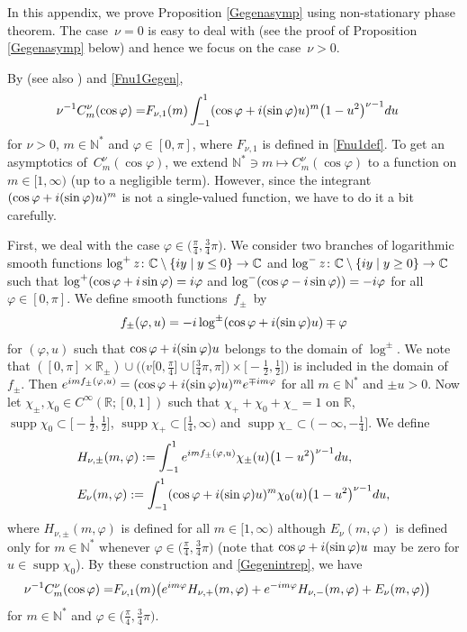 \documentclass[11pt]{article}
\numberwithin{equation}{section}
\def\R{\mathbb{R}}%
\DeclareMathOperator{\supp}{supp}%
\def\f{\varphi}
\def\n{\nu}
\begin{document}
In this appendix, we prove Proposition \ref{Gegenasymp} using non-stationary phase theorem. The case~${\n=0}$ is easy to deal with (see the proof of Proposition \ref{Gegenasymp} below) and hence we focus on the case~${\n>0}$.

By \cite[equation~(4.30)]{BKO} (see also \cite[Section 10]{IJ}) and \eqref{Fnu1Gegen},
\begin{align}\label{Gegenintrep}
\n^{-1}C_m^{\n}(\cos\f)=&F_{\n,1}(m)\int_{-1}^{1}(\cos\f+{\rm i}(\sin\f)u)^m\bigl(1-u^2\bigr)^{\n-1}{\rm d}u
\end{align}
for $\n>0$, $m\in\mathbb{N}^*$ and $\f\in [0,\pi]$, where $F_{\n,1}$ is defined in \eqref{Fnu1def}. To get an asymptotics of~$C_m^{\n}(\cos\f)$, we extend $\mathbb{N}^*\ni m\mapsto C_m^{\n}(\cos\f)$ to a function on $m\in [1,\infty)$ (up to a negligible term). However, since the integrant $(\cos\f+{\rm i}(\sin\f)u)^m$ is not a single-valued function, we have to do it a bit carefully.

First, we deal with the case $\f\in \bigl(\frac{\pi}{4}, \frac{3}{4}\pi\bigr)$.
We consider two branches of logarithmic smooth functions $\log^+z\colon\mathbb{C}\setminus \{{\rm i}y\mid y\leq 0\}\to \mathbb{C}$ and $\log^-z\colon\mathbb{C}\setminus \{{\rm i}y\mid y\geq 0\}\to \mathbb{C}$ such that $\log^+(\cos \f+{\rm i}\sin \f)={\rm i}\f$ and $\log^-(\cos\f-{\rm i}\sin\f))=-{\rm i}\f$ for all $\f\in [0,\pi]$. We define smooth functions~$f_{\pm}$~by
\begin{align*}
f_{\pm}(\f,u)=-{\rm i}\log^{\pm}(\cos\f+{\rm i}(\sin\f)u)\mp \f
\end{align*}
for $(\f,u)$ such that $\cos\f+{\rm i}(\sin\f)u$ belongs to the domain of $\log^{\pm}$. We note that
$([0,\pi]\times \R_{\pm})\cup \bigl(\bigl(v[0,\frac{\pi}{4}\bigr]\cup \bigl[\frac{3}{4}\pi,\pi\bigr]\bigr)\times \bigl[-\frac{1}{2},\frac{1}{2}\bigr] \bigr)$ is included in the domain of $f_{\pm}$.
Then ${\rm e}^{{\rm i}mf_{\pm}(\f,u)}=(\cos\f+{\rm i}(\sin\f)u)^m{\rm e}^{\mp {\rm i}m\f}$ for all $m\in\mathbb{N}^*$ and $\pm u>0$.
Now let $\chi_{\pm},\chi_0\in C^{\infty}(\R;[0,1])$ such that $\chi_++\chi_0+\chi_-=1$ on $\R$, $\supp\chi_0\subset \bigl[-\frac{1}{2},\frac{1}{2}\bigr]$, $\supp \chi_+\subset \bigl[\frac{1}{4},\infty\bigr)$ and $\supp\chi_-\subset \bigl(-\infty,-\frac{1}{4}\bigr]$. We define
\begin{align*}
&H_{\n,\pm}(m,\f):=\int_{-1}^1{\rm e}^{{\rm i}mf_{\pm}(\f,u)}\chi_{\pm}(u)\bigl(1-u^2\bigr)^{\n-1}{\rm d}u,\\
&E_{\n}(m,\f):=\int_{-1}^1(\cos \f+{\rm i}(\sin\f)u)^m\chi_{0}(u)\bigl(1-u^2\bigr)^{\n-1}{\rm d}u,
\end{align*}
where $H_{\n,\pm}(m,\f)$ is defined for all $m\in [1,\infty)$ although $E_{\n}(m,\f)$ is defined only for $m\in \mathbb{N}^*$ whenever $\f\in \bigl(\frac{\pi}{4}, \frac{3}{4}\pi\bigr)$ (note that $\cos\f+{\rm i}(\sin \f)u$ may be zero for $u\in \supp \chi_0$). By these construction and \eqref{Gegenintrep}, we have
\begin{align}\label{Gegendecom}
\n^{-1}C_m^{\n}(\cos\f)=&F_{\n,1}(m)\bigl({\rm e}^{{\rm i}m\f}H_{\n,+}(m,\f)+{\rm e}^{-{\rm i}m\f}H_{\n,-}(m,\f)+E_{\n}(m,\f) \bigr)
\end{align}
for $m\in\mathbb{N}^*$ and $\f\in \bigl(\frac{\pi}{4}, \frac{3}{4}\pi\bigr)$.
\end{document}
